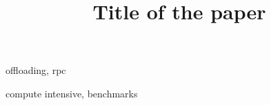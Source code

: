 \documentclass[preprint,!times]{sigplanconf}
\newcommand{\ignore}[1]{}
\begin{document}
\copyrightdata{[to be supplied]} 

\preprintfooter{}   %

\title{Title of the paper}

\authorinfo{}
\ignore{
\authorinfo{Pranith Kumar \and Second Author}
           {Georgia Institute of Technology}
           {\{pranith, second.author\}@gatech.edu}
}

\maketitle




\terms
offloading, rpc 

\keywords
compute intensive, benchmarks


















%


\end{document}
